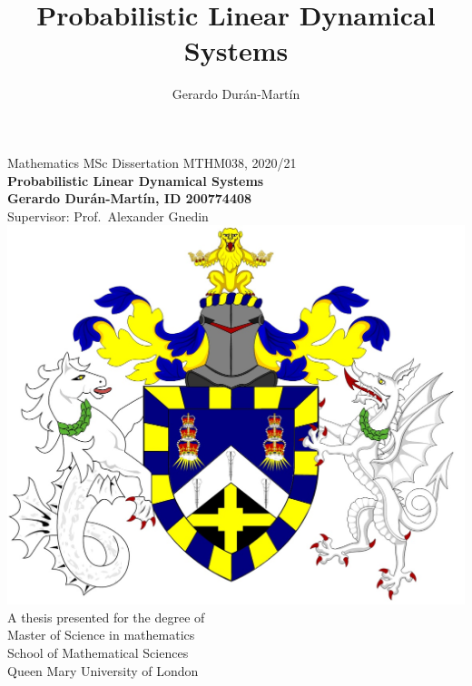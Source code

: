 \documentclass[12pt, oneside]{book}
\title{Probabilistic Linear Dynamical Systems}
\author{Gerardo Durán-Martín}
\numberwithin{equation}{section}
\begin{document}
\begin{titlepage}
	\begin{center}
	\vspace{-2cm}
	Mathematics MSc Dissertation MTHM038, 2020/21
	\\
    \Huge
    \textbf{Probabilistic Linear Dynamical Systems}
    \\
    \Large
    \vspace{0.4cm}        
    \textbf{Gerardo Durán-Martín, ID 200774408}
    \\
    \large Supervisor: Prof.\ Alexander Gnedin
    \\
    \vspace{0.9cm}
    \includegraphics[scale=0.3]{../figures/QMCrest.jpg}
    \\
    \vspace{0.9cm}        
    \LARGE 
    A thesis presented for the degree of\\
    Master of Science in mathematics\\
    \vspace{0.7cm}        
    \Large
    School of Mathematical Sciences\\ 
    Queen Mary University of London \\
	\end{center}
\end{titlepage}

\allowdisplaybreaks
\nocite{*}
\end{document}
